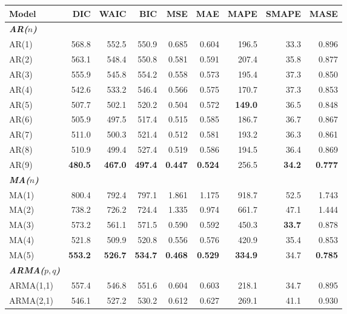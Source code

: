 \documentclass{Configuration_Files/PoliMi3i_thesis}
\begin{document}
\begin{table}[H]
  \centering
  \small
  \begin{tabular}{@{}lrrrrrrrr@{}}
    \toprule
    \textbf{Model} & \textbf{DIC} & \textbf{WAIC} & \textbf{BIC} & \textbf{MSE} 
      & \textbf{MAE} & \textbf{MAPE} & \textbf{SMAPE} & \textbf{MASE} \\
    \midrule
\textbf{\textit{AR(\(n\))}} \\
    AR(1)  & 568.8 & 552.5 & 550.9 & 0.685 & 0.604 & 196.5 & 33.3 & 0.896 \\
    AR(2)  & 563.1 & 548.4 & 550.8 & 0.581 & 0.591 & 207.4 & 35.8 & 0.877 \\
    AR(3)  & 555.9 & 545.8 & 554.2 & 0.558 & 0.573 & 195.4 & 37.3 & 0.850 \\
    AR(4)  & 542.6 & 533.2 & 546.4 & 0.566 & 0.575 & 170.7 & 37.3 & 0.853 \\
    AR(5)  & 507.7 & 502.1 & 520.2 & 0.504 & 0.572 & \textbf{149.0} & 36.5 & 0.848 \\
    AR(6)  & 505.9 & 497.5 & 517.4 & 0.515 & 0.585 & 186.7 & 36.7 & 0.867 \\
    AR(7)  & 511.0 & 500.3 & 521.4 & 0.512 & 0.581 & 193.2 & 36.3 & 0.861 \\
    AR(8)  & 510.9 & 499.4 & 527.4 & 0.519 & 0.586 & 194.5 & 36.4 & 0.869 \\
    AR(9)  & \textbf{480.5} & \textbf{467.0} & \textbf{497.4} 
           & \textbf{0.447} & \textbf{0.524} & 256.5 & \textbf{34.2} & \textbf{0.777} \\
    \midrule
\textbf{\textit{MA(\(n\))}} \\
    MA(1)  & 800.4 & 792.4 & 797.1 & 1.861 & 1.175 & 918.7 & 52.5 & 1.743 \\
    MA(2)  & 738.2 & 726.2 & 724.4 & 1.335 & 0.974 & 661.7 & 47.1 & 1.444 \\
    MA(3)  & 573.2 & 561.1 & 571.5 & 0.590 & 0.592 & 450.3 & \textbf{33.7} & 0.878 \\
    MA(4)  & 521.8 & 509.9 & 520.8 & 0.556 & 0.576 & 420.9 & 35.4 & 0.853 \\
    MA(5)  & \textbf{553.2} & \textbf{526.7} & \textbf{534.7} 
           & \textbf{0.468} & \textbf{0.529} & \textbf{334.9} & 34.7 & \textbf{0.785} \\
    \midrule
\textbf{\textit{ARMA(\(p,q\))}} \\
    ARMA(1,1) & 557.4 & 546.8 & 551.6 & 0.604 & 0.603 & 218.1 & 34.7 & 0.895 \\
    ARMA(2,1) & 546.1 & 527.2 & 530.2 & 0.612 & 0.627 & 269.1 & 41.1 & 0.930 \\

\end{tabular}
\end{table}
\end{document}
